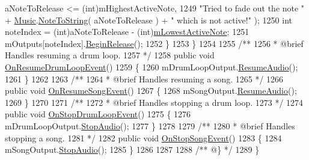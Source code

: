 \begin{DoxyCodeInclude}
      aNoteToRelease <= (\textcolor{keywordtype}{int})mHighestActiveNote,
1249                 \textcolor{stringliteral}{"Tried to fade out the note "} + \hyperlink{class_music}{Music}.\hyperlink{group___music_stat_func_ga85a22c905d56d4c5f4e62159bfecee8c}{NoteToString}( aNoteToRelease ) + \textcolor{stringliteral}{"
       which is not active!"} );
1250             \textcolor{keywordtype}{int} noteIndex = (int)aNoteToRelease - (\textcolor{keywordtype}{int})\hyperlink{group___v_i_m_priv_ga5e3a5116e0dabb37e0ea21d73ac1567e}{mLowestActiveNote};
1251             mOutputs[noteIndex].\hyperlink{group___n_o_o_pub_func_ga044e62759958d717c7fa4fd1615e2ec1}{BeginRelease}();
1252         \}
1253     \}
1254 \textcolor{comment}{}
1255 \textcolor{comment}{    /**}
1256 \textcolor{comment}{     * @brief Handles resuming a drum loop.}
1257 \textcolor{comment}{    */}
1258     \textcolor{keyword}{public} \textcolor{keywordtype}{void} \hyperlink{group___v_i_m_handlers_ga97e3e73e05a7ab6027f25573712367a2}{OnResumeDrumLoopEvent}()
1259     \{
1260         mDrumLoopOutput.\hyperlink{group___n_o_o_pub_func_ga2df8edec357dd4123146c9a7e8485ffb}{ResumeAudio}();
1261     \}
1262 \textcolor{comment}{}
1263 \textcolor{comment}{    /**}
1264 \textcolor{comment}{     * @brief Handles resuming a song.}
1265 \textcolor{comment}{    */}
1266     \textcolor{keyword}{public} \textcolor{keywordtype}{void} \hyperlink{group___v_i_m_handlers_gaca3d2c89672fe0eb3d94b3cb2072de59}{OnResumeSongEvent}()
1267     \{
1268         mSongOutput.\hyperlink{group___n_o_o_pub_func_ga2df8edec357dd4123146c9a7e8485ffb}{ResumeAudio}();
1269     \}
1270 \textcolor{comment}{}
1271 \textcolor{comment}{    /**}
1272 \textcolor{comment}{     * @brief Handles stopping a drum loop.}
1273 \textcolor{comment}{    */}
1274     \textcolor{keyword}{public} \textcolor{keywordtype}{void} \hyperlink{group___v_i_m_handlers_ga9d251d8b2036a3416680ced5d6125d0e}{OnStopDrumLoopEvent}()
1275     \{
1276         mDrumLoopOutput.\hyperlink{group___n_o_o_pub_func_gae8a8e5bc027fd0186464a68399a4fecb}{StopAudio}();
1277     \}
1278 \textcolor{comment}{}
1279 \textcolor{comment}{    /**}
1280 \textcolor{comment}{     * @brief Handles stopping a song.}
1281 \textcolor{comment}{    */}
1282     \textcolor{keyword}{public} \textcolor{keywordtype}{void} \hyperlink{group___v_i_m_handlers_ga5d9afb7a74107b5c6016555f0bb0a0a8}{OnStopSongEvent}()
1283     \{
1284         mSongOutput.\hyperlink{group___n_o_o_pub_func_gae8a8e5bc027fd0186464a68399a4fecb}{StopAudio}();
1285     \}
1286 
1287 \textcolor{comment}{}
1288 \textcolor{comment}{    /** @\} */}
1289 \}
\end{DoxyCodeInclude}
 